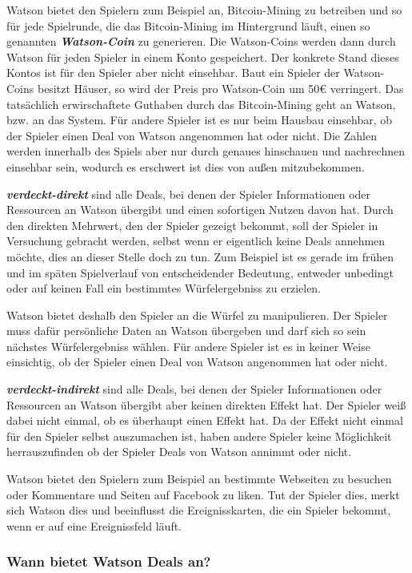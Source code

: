 \documentclass[german]{cgspaper} %
\newcommand{\neuerBegriff}[1]{\textbf{\textit{#1}}}
\begin{document}
Watson bietet den Spielern zum Beispiel an, Bitcoin-Mining zu betreiben und so für jede Spielrunde, die das Bitcoin-Mining im Hintergrund läuft, einen so genannten \neuerBegriff{Watson-Coin} zu generieren.
Die Watson-Coins werden dann durch Watson für jeden Spieler in einem Konto gespeichert.
Der konkrete Stand dieses Kontos ist für den Spieler aber nicht einsehbar.
Baut ein Spieler der Watson-Coins besitzt Häuser, so wird der Preis pro Watson-Coin um 50€ verringert.
Das tatsächlich erwirschaftete Guthaben durch das Bitcoin-Mining geht an Watson, bzw. an das System.
Für andere Spieler ist es nur beim Hausbau einsehbar, ob der Spieler einen Deal von Watson angenommen hat oder nicht.
Die Zahlen werden innerhalb des Spiels aber nur durch genaues hinschauen und nachrechnen einsehbar sein, wodurch es erschwert ist dies von außen mitzubekommen. 

\neuerBegriff{verdeckt-direkt} sind alle Deals, bei denen der Spieler Informationen oder Ressourcen an Watson übergibt und einen sofortigen Nutzen davon hat. 
Durch den direkten Mehrwert, den der Spieler gezeigt bekommt, soll der Spieler in Versuchung gebracht werden, selbst wenn er eigentlich keine Deals annehmen möchte, dies an dieser Stelle doch zu tun.
Zum Beispiel ist es gerade im frühen und im späten Spielverlauf von entscheidender Bedeutung, entweder unbedingt oder auf keinen Fall ein bestimmtes Würfelergebniss zu erzielen.

Watson bietet deshalb den Spieler an die Würfel zu manipulieren.
Der Spieler muss dafür persönliche Daten an Watson übergeben und darf sich so sein nächstes Würfelergebniss wählen.
Für andere Spieler ist es in keiner Weise einsichtig, ob der Spieler einen Deal von Watson angenommen hat oder nicht.

\neuerBegriff{verdeckt-indirekt} sind alle Deals, bei denen der Spieler Informationen oder Ressourcen an Watson übergibt aber keinen direkten Effekt hat.
Der Spieler weiß dabei nicht einmal, ob es überhaupt einen Effekt hat.
Da der Effekt nicht einmal für den Spieler selbst auszumachen ist, haben andere Spieler keine Möglichkeit herrauszufinden ob der Spieler Deals von Watson annimmt oder nicht.

Watson bietet den Spielern zum Beispiel an bestimmte Webseiten zu besuchen oder Kommentare und Seiten auf Facebook zu liken.
Tut der Spieler dies, merkt sich Watson dies und beeinflusst die Ereignisskarten, die ein Spieler bekommt, wenn er auf eine Ereignissfeld läuft.


\subsubsection{Wann bietet Watson Deals an?}
\end{document}
